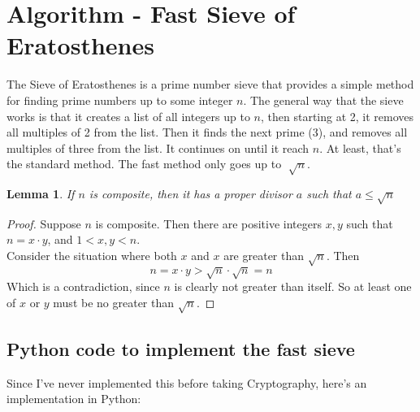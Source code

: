 \documentclass[10pt]{article}
\newtheorem{lemma}[theorem]{Lemma}
\theoremstyle{definition}
\theoremstyle{remark}
\begin{document}
\section{Algorithm - Fast Sieve of Eratosthenes}
The Sieve of Eratosthenes is a prime number sieve that provides a simple method for finding prime numbers up to some integer $n$.  The general way that the sieve works is that it creates a list of all integers up to $n$, then starting at 2, it removes all multiples of 2 from the list.  Then it finds the next prime (3), and removes all multiples of three from the list.  It continues on until it reach $n$.  At least, that's the standard method.  The fast method only goes up to $\sqrt[]{n}$.
\begin{lemma}
If $n$ is composite, then it has a proper divisor $a$ such that $a \leq \sqrt{n}$
\end{lemma}
\begin{proof}
Suppose $n$ is composite.  Then there are positive integers $x,y$ such that $n = x \cdot y$, and $1 < x,y < n$.\\
Consider the situation where both $x$ and $x$ are greater than $\sqrt{n}$.  Then 
$$n = x \cdot y > \sqrt{n} \cdot \sqrt{n} = n$$
Which is a contradiction, since $n$ is clearly not greater than itself.  So at least one of $x$ or $y$ must be no greater than $\sqrt{n}$.
\end{proof}
\subsection{Python code to implement the fast sieve}
Since I've never implemented this before taking Cryptography, here's an implementation in Python:
\end{document}
